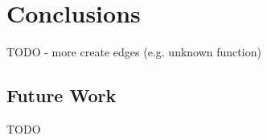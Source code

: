 \section{Conclusions}
\label{sec:conclusions}
TODO
- more create edges (e.g. unknown function)
  \subsection{Future Work}
  \label{sec:conclusions:futureWork}
  TODO